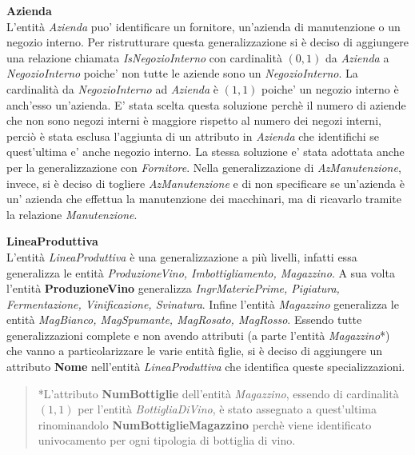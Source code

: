 \begin{flushleft}
	\textbf{\large{Azienda}}\\
	L'entità \emph{Azienda} puo' identificare un fornitore, un'azienda di manutenzione o un negozio interno. Per ristrutturare questa generalizzazione si è deciso di aggiungere una relazione chiamata \emph{IsNegozioInterno} con cardinalità $(0,1)$ da \emph{Azienda} a \emph{NegozioInterno} poiche' non tutte le aziende sono un \emph{NegozioInterno}. La cardinalità da \emph{NegozioInterno} ad \emph{Azienda} è $(1,1)$ poiche' un negozio interno è anch'esso un'azienda. E' stata scelta questa soluzione perchè il numero di aziende che non sono negozi interni è maggiore rispetto al numero dei negozi interni, perciò è stata esclusa l'aggiunta di un attributo in \emph{Azienda} che identifichi se quest'ultima e' anche negozio interno. La stessa soluzione e' stata adottata anche per la generalizzazione con \emph{Fornitore}. Nella generalizzazione di \emph{AzManutenzione}, invece, si è deciso di togliere \emph{AzManutenzione} e di non specificare se un'azienda è un' azienda che effettua la manutenzione dei macchinari, ma di ricavarlo tramite la relazione \emph{Manutenzione}.
\end{flushleft}

\begin{flushleft}
	\textbf{\large{LineaProduttiva}}\\
	L'entità \emph{LineaProduttiva} è una generalizzazione a più livelli, infatti essa generalizza le entità \emph{ProduzioneVino, Imbottigliamento, Magazzino}. A sua volta l'entità \textbf{ProduzioneVino} generalizza \emph{IngrMateriePrime, Pigiatura, Fermentazione, Vinificazione, Svinatura}. Infine l'entità \emph{Magazzino} generalizza le entità \emph{MagBianco, MagSpumante, MagRosato, MagRosso}. Essendo tutte generalizzazioni complete e non avendo attributi (a parte l'entità \emph{Magazzino}*) che vanno a particolarizzare le varie entità figlie, si è deciso di aggiungere un attributo \textbf{Nome} nell'entità \emph{LineaProduttiva} che identifica queste specializzazioni.
\end{flushleft}

\begin{verse}
	*L'attributo \textbf{NumBottiglie} dell'entità \emph{Magazzino}, essendo di cardinalità $(1,1)$ per l'entità \emph{BottigliaDiVino}, è stato assegnato a quest'ultima rinominandolo \textbf{NumBottiglieMagazzino} perchè viene identificato univocamento per ogni tipologia di bottiglia di vino.
\end{verse}